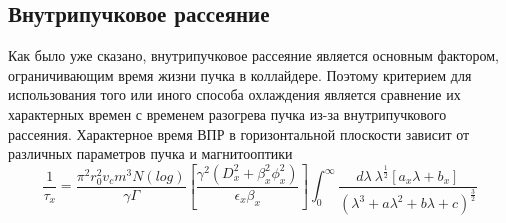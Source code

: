 \newpage
\subsection{Внутрипучковое рассеяние}\label{sec:ions_light/IBS_res_reg}

\par Как было уже сказано, внутрипучковое рассеяние является основным фактором, ограничивающим время жизни пучка в коллайдере. Поэтому критерием для использования того или иного способа охлаждения является сравнение их характерных времен с временем разогрева пучка из-за внутрипучкового рассеяния. Характерное время ВПР в горизонтальной плоскости зависит от различных параметров пучка и магнитооптики
\begin{equation}
\frac{1}{\tau_x}=\frac{\pi^2r_0^2v_cm^3N\left(log\right)}{\gamma\Gamma}\left[\frac{\gamma^2\left(D_x^2+\beta_x^2\phi_x^2\right)}{\epsilon_x\beta_x}\right]\int_{0}^{\infty}\frac{d\lambda\ \lambda^\frac{1}{2}\left[a_x\lambda+b_x\right]}{\left(\lambda^3+a\lambda^2+b\lambda+c\right)^\frac{3}{2}}
\label{eq:IBS}
\end{equation}

\begin{comment}
\begin{equation}
\frac{1}{\tau_{\textrm{IBS}}}=\frac{\sqrt\pi}{4}\frac{cZ^2r_p^2L_C}{A}\cdot\frac{N}{C_{\mathrm{orb\ }}}\cdot\frac{\left\langle\beta_x\right\rangle}{\beta^3\gamma^3\varepsilon_x^{5/2}\left\langle\sqrt{\beta_x}\right\rangle}\left(\left\langle\frac{D_x^2+{\dot{D}}_x^2}{\beta_x^2}\right\rangle-\frac{1}{\gamma^2}\right).
\label{eq:IBS}
\end{equation}
\end{comment}

